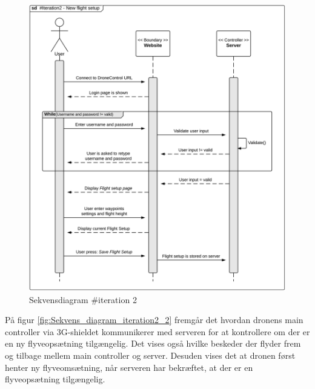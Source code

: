\begin{figure}[H]
	\centering
	\includegraphics[width=1\textwidth]{Billeder/sekvens/sekvens_iteration2_1}
	\caption{Sekvensdiagram \#iteration 2}
	\label{fig:Sekvens_diagram_iteration2_1}
\end{figure}


\newpage

På figur \ref{fig:Sekvens_diagram_iteration2_2} fremgår det hvordan dronens main controller via 3G-shieldet kommunikerer med serveren for at kontrollere om der er en ny flyveopsætning tilgængelig. Det vises også hvilke beskeder der flyder frem og tilbage mellem main controller og server. Desuden vises det at dronen først henter ny flyveomsætning, når serveren har bekræftet, at der er en flyveopsætning tilgængelig.   

